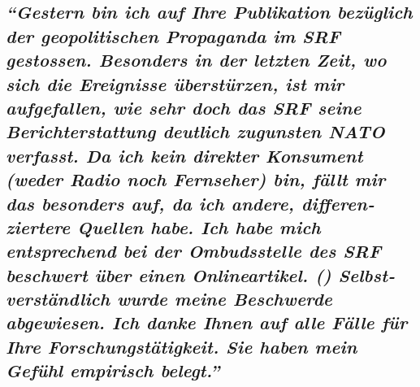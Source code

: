 \hypertarget{gestern-bin-ich-auf-ihre-publikation-bezuxfcglich-der-geopolitischen-propaganda-im-srf-gestossen-besonders-in-der-letzten-zeit-wo-sich-die-ereignisse-uxfcberstuxfcrzen-ist-mir-aufgefallen-wie-sehr-doch-das-srf-seine-berichterstattung-deutlich-zugunsten-nato-verfasst-da-ich-kein-direkter-konsument-weder-radio-noch-fernseher-bin-fuxe4llt-mir-das-besonders-auf-da-ich-andere-differenziertere-quellen-habe-ich-habe-mich-entsprechend-bei-der-ombudsstelle-des-srf-beschwert-uxfcber-einen-onlineartikel--selbstverstuxe4ndlich-wurde-meine-beschwerde-abgewiesen-ich-danke-ihnen-auf-alle-fuxe4lle-fuxfcr-ihre-forschungstuxe4tigkeit-sie-haben-mein-gefuxfchl-empirisch-belegt}{%
\subsection{\texorpdfstring{\emph{``Gestern bin ich auf Ihre Publikation
bezüglich der geo­po­li­tischen Propaganda im SRF gestossen. Besonders
in der letzten Zeit, wo sich die Ereignisse überstürzen, ist mir
aufgefallen, wie sehr doch das SRF seine Bericht­er­stattung deutlich
zugunsten NATO verfasst. Da ich kein direkter Konsument (weder Radio
noch Fernseher) bin, fällt mir das besonders auf, da ich andere,
differen­ziertere Quellen habe. Ich habe mich entsprechend bei der
Om­buds­stelle des SRF beschwert über einen Online­artikel. ()
Selbst­ver­ständlich wurde meine Beschwerde abgewiesen. Ich danke Ihnen
auf alle Fälle für Ihre For­schungs­tätigkeit. Sie haben mein Gefühl
empirisch
belegt.''}}{``Gestern bin ich auf Ihre Publikation bezüglich der geo­po­li­tischen Propaganda im SRF gestossen. Besonders in der letzten Zeit, wo sich die Ereignisse überstürzen, ist mir aufgefallen, wie sehr doch das SRF seine Bericht­er­stattung deutlich zugunsten NATO verfasst. Da ich kein direkter Konsument (weder Radio noch Fernseher) bin, fällt mir das besonders auf, da ich andere, differen­ziertere Quellen habe. Ich habe mich entsprechend bei der Om­buds­stelle des SRF beschwert über einen Online­artikel. () Selbst­ver­ständlich wurde meine Beschwerde abgewiesen. Ich danke Ihnen auf alle Fälle für Ihre For­schungs­tätigkeit. Sie haben mein Gefühl empirisch belegt.''}}\label{gestern-bin-ich-auf-ihre-publikation-bezuxfcglich-der-geopolitischen-propaganda-im-srf-gestossen-besonders-in-der-letzten-zeit-wo-sich-die-ereignisse-uxfcberstuxfcrzen-ist-mir-aufgefallen-wie-sehr-doch-das-srf-seine-berichterstattung-deutlich-zugunsten-nato-verfasst-da-ich-kein-direkter-konsument-weder-radio-noch-fernseher-bin-fuxe4llt-mir-das-besonders-auf-da-ich-andere-differenziertere-quellen-habe-ich-habe-mich-entsprechend-bei-der-ombudsstelle-des-srf-beschwert-uxfcber-einen-onlineartikel--selbstverstuxe4ndlich-wurde-meine-beschwerde-abgewiesen-ich-danke-ihnen-auf-alle-fuxe4lle-fuxfcr-ihre-forschungstuxe4tigkeit-sie-haben-mein-gefuxfchl-empirisch-belegt}}

